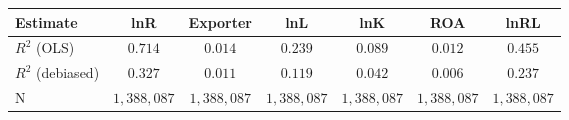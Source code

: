 \begin{tabular}{l*{6}{c}}
\hline\hline
 Estimate & lnR & Exporter & lnL & lnK & ROA & lnRL \\
\hline
\addlinespace $ R^2$ (OLS) & $0.714$ & $0.014$ & $0.239$ & $0.089$ & $0.012$ & $0.455$ \\
$ R^2$ (debiased) & $0.327$ & $0.011$ & $0.119$ & $0.042$ & $0.006$ & $0.237$ \\
N & $1,388,087$ & $1,388,087$ & $1,388,087$ & $1,388,087$ & $1,388,087$ & $1,388,087$ \\
\hline\hline
\end{tabular}
